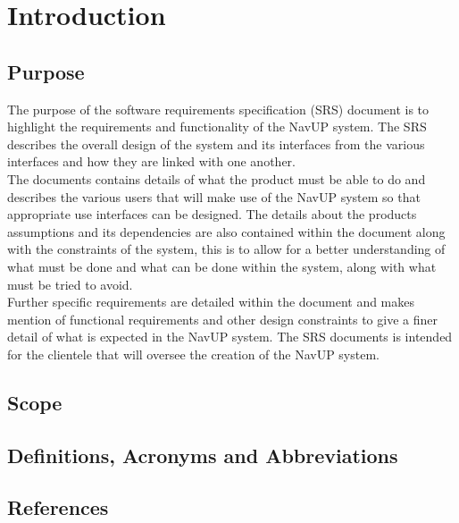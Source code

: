 \documentclass[a4paper,12pt]{article}
\begin{document}
\newpage
\section{Introduction}

\subsection{Purpose}
The purpose of the software requirements specification (SRS) document is to highlight the requirements and functionality of the NavUP system. The SRS describes the overall design of the system and its interfaces from the various interfaces and how they are linked with one another.\\
The documents contains details of what the product must be able to do and describes the various users that will make use of the NavUP system so that appropriate use interfaces can be designed. The details about the products assumptions and its dependencies are also contained within the document along with the constraints of the system, this is to allow for a better understanding of what must be done and what can be done within the system, along with what must be tried to avoid.\\
Further specific requirements are detailed within the document and makes mention of functional requirements and other design constraints to give a finer detail of what is expected in the NavUP system. The SRS documents is intended for the clientele that will oversee the creation of the NavUP system.\\
\subsection{Scope}

\subsection{Definitions, Acronyms and Abbreviations}

\subsection{References}
 
\end{document}
